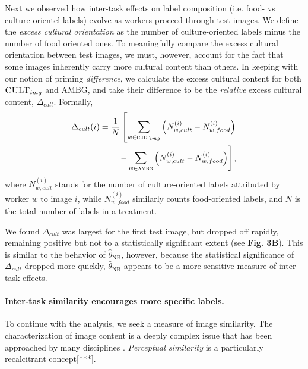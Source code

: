 \documentclass[letterpaper]{article}
\begin{document}
Next we observed how inter-task effects on label composition (i.e. food- vs 
culture-orientel labels) evolve as workers proceed through test images.
We define the \textit{excess cultural orientation} as the number of 
culture-oriented labels minus the number of food oriented ones.  To 
meaningfully compare the excess cultural orientation between test images, we 
must, however, account for the fact that some images inherently carry more 
cultural content than others. In keeping with our notion of priming 
\textit{difference}, we calculate the excess cultural content for both 
$\textsc{CULT}_{img}$ and \textsc{AMBG}, and take their difference to be
the \textit{relative} excess cultural content, $\Delta_{cult}$.  Formally,
\begin{align}
	\begin{split}
	\Delta_{cult}(i) = \frac{1}{N}\left[ \sum_{w\in\textsc{cult}_{img}} \left(N_{w,cult}^{(i)} - N_{w,food}^{(i)}\right)\right. \\
\left.	- \sum_{w\in\textsc{ambg}} \left(N_{w,cult}^{(i)} - N_{w,food}^{(i)}\right)\right],
	\end{split}
\end{align}
where $N_{w,cult}^{(i)}$ stands for the number of culture-oriented labels 
attributed by worker $w$ to image $i$, while $N_{w,food}^{(i)}$ similarly 
counts food-oriented labels, and $N$ is the total number of labels in a 
treatment.  

We found $\Delta_{cult}$ was largest for the first test image, but dropped off 
rapidly, remaining positive but not to a statistically significant extent
(see \textbf{Fig. 3B}).  
This is similar to the behavior of $\hat{\theta}_\text{NB}$, however, because
the statistical significance of $\Delta_{cult}$ dropped more quickly, 
$\hat{\theta}_\text{NB}$ appears to be a more sensitive measure of inter-task 
effects.
\paragraph{Inter-task similarity encourages more specific labels.}
To continue with the analysis, we seek a measure of image similarity.  The 
characterization of image content is a deeply complex issue that has been 
approached by many disciplines 
\cite{panofsky1939studies,shatford1986analyzing,Tversky1977327,Jaimes20002}.
\textit{Perceptual similarity} is a particularly recalcitrant concept[***].
\end{document}
